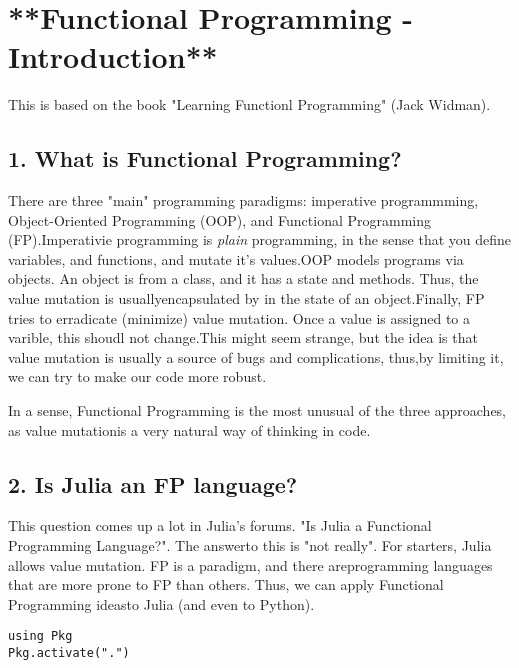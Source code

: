 \newpage

\chapter{**Functional Programming - Introduction**}


This is based on the book "Learning Functionl Programming" (Jack Widman).


\section{1. What is Functional Programming?}


There are three "main" programming paradigms: imperative programmming, Object-Oriented Programming (OOP), and Functional Programming (FP).Imperativie programming is \textit{plain} programming, in the sense that you define variables, and functions, and mutate it's values.OOP models programs via objects. An object is from a class, and it has a state and methods. Thus, the value mutation is usuallyencapsulated by in the state of an object.Finally, FP tries to erradicate (minimize) value mutation. Once a value is assigned to a varible, this shoudl not change.This might seem strange, but the idea is that value mutation is usually a source of bugs and complications, thus,by limiting it, we can try to make our code more robust.



In a sense, Functional Programming is the most unusual of the three approaches, as value mutationis a very natural way of thinking in code.


\section{2. Is Julia an FP language?}


This question comes up a lot in Julia's forums. "Is Julia a Functional Programming Language?". The answerto this is "not really". For starters, Julia allows value mutation. FP is a paradigm, and there areprogramming languages that are more prone to FP than others. Thus, we can apply Functional Programming ideasto Julia (and even to Python).
\bigskip
\begin{lstlisting}[language=JuliaLocal, style=julia, texcl=true]
using Pkg
Pkg.activate(".")
\end{lstlisting}

\begingroup

\fontsize{10pt}{12pt}\selectfont

